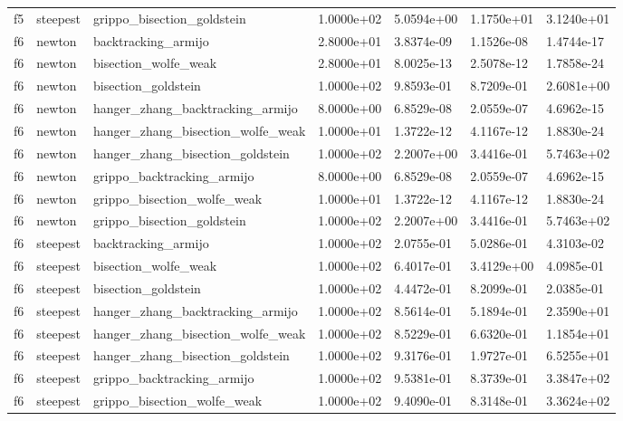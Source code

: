 \documentclass[a4paper,11pt]{article}
\numberwithin{equation}{section} %
\begin{document}
\begin{longtable}{p{1.5cm}|p{1.5cm}|p{4cm}|p{2cm}|p{2cm}|p{2cm}|p{2cm}}
        f5 & steepest & grippo\_bisection\_goldstein & 1.0000e+02 & 5.0594e+00 & 1.1750e+01 & 3.1240e+01 \\
        f6 & newton & backtracking\_armijo & 2.8000e+01 & 3.8374e-09 & 1.1526e-08 & 1.4744e-17 \\
        f6 & newton & bisection\_wolfe\_weak & 2.8000e+01 & 8.0025e-13 & 2.5078e-12 & 1.7858e-24 \\
        f6 & newton & bisection\_goldstein & 1.0000e+02 & 9.8593e-01 & 8.7209e-01 & 2.6081e+00 \\
        f6 & newton & hanger\_zhang\_backtracking\_armijo & 8.0000e+00 & 6.8529e-08 & 2.0559e-07 & 4.6962e-15 \\
        f6 & newton & hanger\_zhang\_bisection\_wolfe\_weak & 1.0000e+01 & 1.3722e-12 & 4.1167e-12 & 1.8830e-24 \\
        f6 & newton & hanger\_zhang\_bisection\_goldstein & 1.0000e+02 & 2.2007e+00 & 3.4416e-01 & 5.7463e+02 \\
        f6 & newton & grippo\_backtracking\_armijo & 8.0000e+00 & 6.8529e-08 & 2.0559e-07 & 4.6962e-15 \\
        f6 & newton & grippo\_bisection\_wolfe\_weak & 1.0000e+01 & 1.3722e-12 & 4.1167e-12 & 1.8830e-24 \\
        f6 & newton & grippo\_bisection\_goldstein & 1.0000e+02 & 2.2007e+00 & 3.4416e-01 & 5.7463e+02 \\
        f6 & steepest & backtracking\_armijo & 1.0000e+02 & 2.0755e-01 & 5.0286e-01 & 4.3103e-02 \\
        f6 & steepest & bisection\_wolfe\_weak & 1.0000e+02 & 6.4017e-01 & 3.4129e+00 & 4.0985e-01 \\
        f6 & steepest & bisection\_goldstein & 1.0000e+02 & 4.4472e-01 & 8.2099e-01 & 2.0385e-01 \\
        f6 & steepest & hanger\_zhang\_backtracking\_armijo & 1.0000e+02 & 8.5614e-01 & 5.1894e-01 & 2.3590e+01 \\
        f6 & steepest & hanger\_zhang\_bisection\_wolfe\_weak & 1.0000e+02 & 8.5229e-01 & 6.6320e-01 & 1.1854e+01 \\
        f6 & steepest & hanger\_zhang\_bisection\_goldstein & 1.0000e+02 & 9.3176e-01 & 1.9727e-01 & 6.5255e+01 \\
        f6 & steepest & grippo\_backtracking\_armijo & 1.0000e+02 & 9.5381e-01 & 8.3739e-01 & 3.3847e+02 \\
        f6 & steepest & grippo\_bisection\_wolfe\_weak & 1.0000e+02 & 9.4090e-01 & 8.3148e-01 & 3.3624e+02 \\

\end{longtable}
\end{document}
